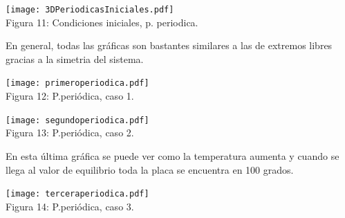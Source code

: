 \documentclass{article}
\begin{document}
\begin{center}
\texttt{[image: 3DPeriodicasIniciales.pdf]}\\
\small{Figura 11: Condiciones iniciales, p. periodica.}
\end{center}

En general, todas las gráficas son bastantes similares a las de extremos libres gracias a la simetria del sistema.
\begin{center}
\texttt{[image: primeroperiodica.pdf]}\\
\small{Figura 12: P.periódica, caso 1.}
\end{center}

\begin{center}
\texttt{[image: segundoperiodica.pdf]}\\
\small{Figura 13: P.periódica, caso 2.}
\end{center}

En esta última gráfica se puede ver como la temperatura aumenta y cuando se llega al valor de equilibrio toda la placa se encuentra en 100 grados.

\begin{center}
\texttt{[image: terceraperiodica.pdf]}\\
\small{Figura 14: P.periódica, caso 3.}
\end{center}
\end{document}
